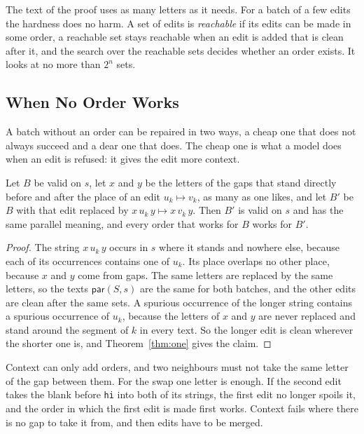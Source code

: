 \documentclass[acmsmall,nonacm,screen]{acmart}
\newcommand{\kw}[1]{\mathsf{#1}}
\newcommand{\str}[1]{\texttt{#1}}
\newcommand{\Par}{\kw{par}}
\newcommand{\claim}[2]{#2}
\begin{document}
The text of the proof uses as many letters as it needs. For a batch of a few edits the
hardness does no harm. A set of edits is \emph{reachable} if its edits can be made in some
order, a reachable set stays reachable when an edit is added that is clean after it, and the
search over the reachable sets decides whether an order exists. It looks at no more than
$2^n$ sets.

\subsection{When No Order Works}

A batch without an order can be repaired in two ways, a cheap one that does not always
succeed and a dear one that does. The cheap one is what a model does when an edit is refused:
it gives the edit more context.

\begin{proposition}[Context]\label{prop:context}
Let $B$ be valid on $s$, let $x$ and $y$ be the letters of the gaps that stand directly
before and after the place of an edit $u_k \mapsto v_k$, as many as one likes, and let $B'$
be $B$ with that edit replaced by $x\,u_k\,y \mapsto x\,v_k\,y$. Then $B'$ is valid on $s$
and has the same parallel meaning, and every order that works for $B$ works for $B'$.
\end{proposition}

\begin{proof}
The string $x\,u_k\,y$ occurs in $s$ where it stands and nowhere else, because each of its
occurrences contains one of $u_k$. Its place overlaps no other place, because $x$ and $y$
come from gaps. The same letters are replaced by the same letters, so the texts $\Par(S, s)$
are the same for both batches, and the other edits are clean after the same sets. A spurious
occurrence of the longer string contains a spurious occurrence of $u_k$, because the letters
of $x$ and $y$ are never replaced and stand around the segment of $k$ in every text. So the
longer edit is clean wherever the shorter one is, and Theorem~\ref{thm:one} gives the claim.
\end{proof}

Context can only add orders, and two neighbours must not take the same letter of the gap
between them. \claim{swap-context}{For the swap one letter is enough. If the second edit
takes the blank before \str{hi} into both of its strings, the first edit no longer spoils
it, and the order in which the first edit is made first works.} Context fails where there is
no gap to take it from, and then edits have to be merged.
\end{document}
